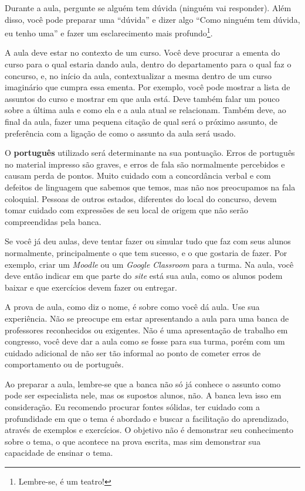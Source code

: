 \documentclass[12pt]{article}
\begin{document}
Durante a aula, pergunte se alguém tem dúvida (ninguém vai responder). Além disso, você pode preparar uma ``dúvida'' e dizer algo ``Como ninguém tem dúvida, eu tenho uma'' e fazer um esclarecimento mais profundo\footnote{Lembre-se, é um teatro!}.


A aula deve estar no contexto de um curso. Você deve procurar a ementa do curso para o qual estaria dando aula, dentro do departamento para o qual faz o concurso, e, no início da aula, contextualizar a mesma dentro de um curso imaginário que cumpra essa ementa. Por exemplo, você pode mostrar a lista de assuntos do curso e mostrar em que aula está. Deve também falar um pouco sobre a última aula e como ela e a aula atual se relacionam. Também deve, ao final da aula, fazer uma pequena citação de qual será o próximo assunto, de preferência com a ligação de como o assunto da aula será usado.

O \textbf{português} utilizado será determinante na sua pontuação.
Erros de português no material impresso são graves, e erros de fala são normalmente percebidos e causam perda de pontos.
Muito cuidado com a concordância verbal e com defeitos de linguagem que sabemos que temos, mas não nos preocupamos na fala coloquial.
Pessoas de outros estados, diferentes do local do concurso, devem tomar cuidado com expressões de seu local de origem que não serão compreendidas pela banca.

Se você já deu aulas, deve tentar fazer ou simular tudo que faz com seus alunos normalmente, principalmente o que tem sucesso, e o que gostaria de fazer.
Por exemplo, criar um \textit{Moodle} ou um \textit{Google Classroom} para a turma.
Na aula, você deve então indicar em que parte do \textit{site} está sua aula, como os alunos podem baixar e que exercícios devem fazer ou entregar.

A prova de aula, como diz o nome, é sobre como você dá aula.
Use sua experiência. Não se preocupe em estar apresentando a aula para uma banca de professores reconhecidos ou exigentes.
Não é uma apresentação de trabalho em congresso, você deve dar a aula  como se fosse para sua turma, porém com um cuidado adicional de não ser tão informal ao ponto de cometer erros de comportamento ou de português.

Ao preparar a aula, lembre-se que a banca não só já conhece o assunto como pode ser especialista nele, mas os supostos alunos, não. A banca leva isso em consideração.
Eu recomendo procurar fontes sólidas, ter cuidado com a profundidade em que o tema é abordado e buscar a facilitação do aprendizado, através de exemplos e exercícios.
O objetivo não é demonstrar seu conhecimento sobre o tema, o que acontece na prova escrita, mas sim demonstrar sua capacidade de ensinar o tema.
\end{document}
